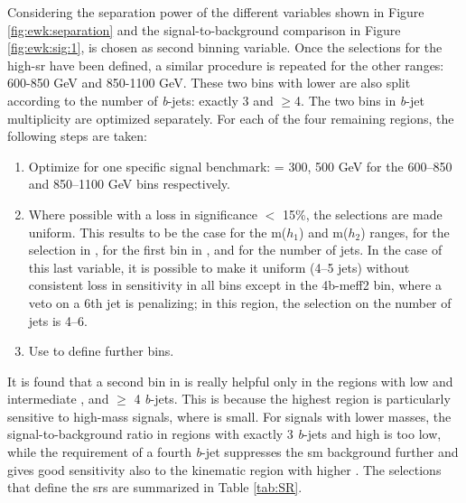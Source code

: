 Considering the separation power of the different variables shown in Figure  \ref{fig:ewk:separation} 
and the signal-to-background comparison in Figure \ref{fig:ewk:sig:1}, 
\dRmax is chosen as second binning variable. 
Once the selections for the high-\meffb \gls{sr} have been defined, 
a similar procedure is repeated for the other \meffb ranges: 600-850 GeV and 850-1100 GeV. 
These two bins with lower \meffb are also split according to the number of \textit{b}-jets: exactly 3 and $\geq$4. 
The two bins in \textit{b}-jet multiplicity are optimized separately. 
For each of the four remaining regions, the following steps are taken:

\begin{enumerate}
\item Optimize for one specific signal benchmark: \mhino = 300, 500 GeV for the 600--850 and 850--1100 GeV \meffb bins respectively.
\item  Where possible with a loss in significance $<$ 15\%, the selections are made uniform. 
This results to be the case for the m($h_1$) and m($h_2$) ranges, for the selection in \met, for the first bin in \dRmax, 
and for the number of jets. In the case of this last variable, it is possible to make it uniform (4--5 jets) 
without consistent loss in sensitivity in all bins except in the 4b-meff2 bin, where a veto on a 6th jet is penalizing; 
in this region, the selection on the number of jets is 4--6.
\item Use \dRmax to define further bins.
\end{enumerate}

It is found that a second bin in \dRmax is really helpful only in the regions with low and intermediate \meffb, and  $\geq$ 4 \textit{b}-jets. 
This is because the highest \meffb region is particularly sensitive to high-mass signals, where \dRmax is small. 
For signals with lower masses, the signal-to-background ratio in regions with exactly 3 \textit{b}-jets and high \dRmax is too low, 
while the requirement of a fourth \textit{b}-jet suppresses the \gls{sm} background further and gives good sensitivity 
also to the kinematic region with higher \dRmax.
The selections that define the \glspl{sr} are summarized in Table \ref{tab:SR}.

